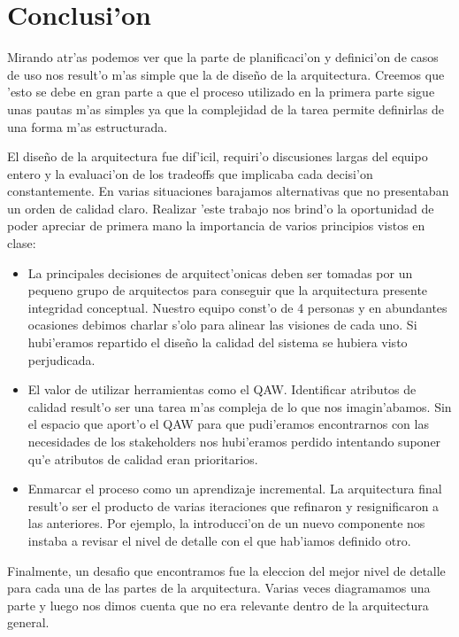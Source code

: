 \section{Conclusi'on}

Mirando atr'as podemos ver que la parte de planificaci'on y definici'on de casos de uso nos result'o m'as simple que la de diseño de
la arquitectura. Creemos que 'esto se debe en gran parte a que el proceso utilizado en la primera parte sigue unas pautas m'as simples
ya que la complejidad de la tarea permite definirlas de una forma m'as estructurada.

El diseño de la arquitectura fue dif'icil, requiri'o discusiones largas del equipo entero y la evaluaci'on de los tradeoffs que implicaba
cada decisi'on constantemente. En varias situaciones barajamos alternativas que no presentaban un orden de calidad claro.
Realizar 'este trabajo nos brind'o la oportunidad de poder apreciar de primera mano la importancia de varios principios vistos en clase:
\begin{itemize}
\item La principales decisiones de arquitect'onicas deben ser tomadas por un pequeno grupo de arquitectos para conseguir que la
  arquitectura presente integridad conceptual. Nuestro equipo const'o de 4 personas y en abundantes ocasiones debimos charlar s'olo para
  alinear las visiones de cada uno. Si hubi'eramos repartido el diseño la calidad del sistema se hubiera visto perjudicada.
\item El valor de utilizar herramientas como el QAW. Identificar atributos de calidad result'o ser una tarea m'as compleja de lo que nos
  imagin'abamos. Sin el espacio que aport'o el QAW para que pudi'eramos encontrarnos con las necesidades de los stakeholders nos hubi'eramos
  perdido intentando suponer qu'e atributos de calidad eran prioritarios.
\item Enmarcar el proceso como un aprendizaje incremental. La arquitectura final result'o ser el producto de varias iteraciones que refinaron
  y resignificaron a las anteriores. Por ejemplo, la introducci'on de un nuevo componente nos instaba a revisar el nivel de detalle con el que
  hab'iamos definido otro.
\end{itemize}
Finalmente, un desafio que encontramos fue la eleccion del mejor nivel de detalle para cada una de las partes de la arquitectura. Varias veces diagramamos
una parte y luego nos dimos cuenta que no era relevante dentro de la arquitectura general.

